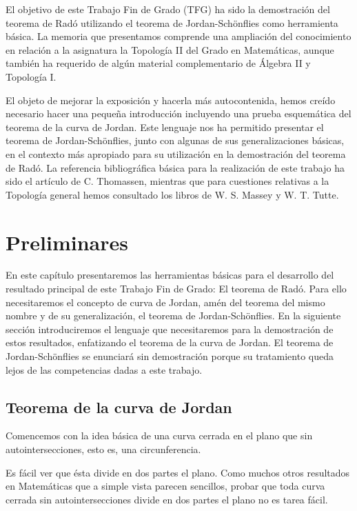 \documentclass[12pt,a4paper,oldfontcommands]{memoir}
\begin{document}
El objetivo  de este Trabajo Fin de Grado (TFG) ha sido la demostración del teorema de Radó   utilizando el teorema de Jordan-Schönflies como herramienta básica. La memoria que presentamos comprende una ampliación del conocimiento en relación a la asignatura la Topología II del Grado en Matemáticas,   aunque también ha requerido  de algún material complementario de  Álgebra II y Topología I.  

El objeto de mejorar la exposición y hacerla más autocontenida, hemos creído necesario hacer una pequeña introducción incluyendo  una prueba esquemática   del teorema de la curva de Jordan. Este lenguaje nos ha permitido  presentar el teorema de Jordan-Schönflies, junto con algunas de sus generalizaciones básicas, en el contexto más apropiado para su utilización   en la demostración del teorema de Radó. La referencia bibliográfica básica para la realización de este trabajo ha sido el artículo de C. Thomassen, \cite{Thomassen}  mientras que para cuestiones relativas a la Topología general hemos consultado los libros de W. S. Massey \cite{Massey} y W. T. Tutte. \cite{Tutte}

\newpage

\chapter{Preliminares}

En este capítulo presentaremos las herramientas básicas para el desarrollo del resultado principal de este Trabajo Fin de Grado: El teorema de Radó. Para ello necesitaremos el concepto de curva de Jordan, amén del teorema del mismo nombre y de su generalización, el teorema de Jordan-Schönflies. En la siguiente sección introduciremos el lenguaje que necesitaremos para la demostración de estos resultados, enfatizando el teorema de la curva de Jordan. El teorema de Jordan-Schönflies se enunciará sin demostración porque su tratamiento queda lejos de las competencias dadas a este trabajo.

\section{Teorema de la curva de Jordan}

Comencemos con la idea básica de una curva cerrada en el plano que sin autointersecciones, esto es, una circunferencia.

Es fácil ver   que  ésta divide en dos partes el plano. Como muchos otros resultados en Matemáticas que a simple vista parecen sencillos, probar que toda curva cerrada sin autointersecciones divide en dos partes el plano no es tarea fácil.
\end{document}

